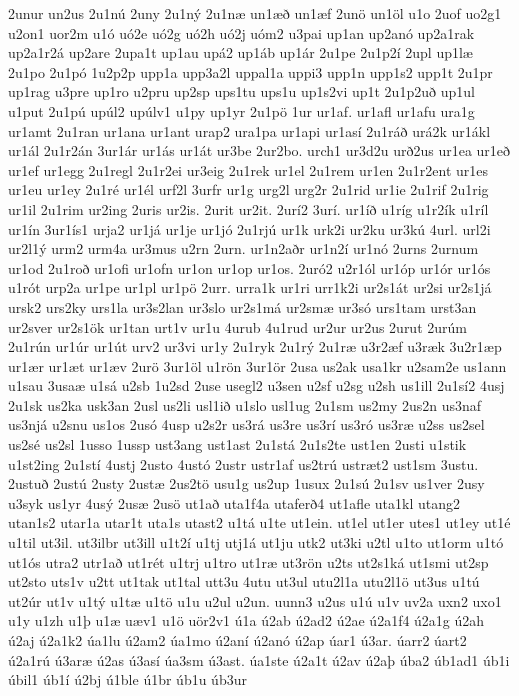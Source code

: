 {2unur
un2us
2u1nú
2uny
2u1ný
2u1næ
un1æð
un1æf
2unö
un1öl
u1o
2uof
uo2g1
u2on1
uor2m
u1ó
uó2e
uó2g
uó2h
uó2j
uóm2
u3pai
up1an
up2anó
up2a1rak
up2a1r2á
up2are
2upa1t
up1au
upá2
up1áb
up1ár
2u1pe
2u1p2í
2upl
up1læ
2u1po
2u1pó
1u2p2p
upp1a
upp3a2l
uppal1a
uppi3
upp1n
upp1s2
upp1t
2u1pr
up1rag
u3pre
up1ro
u2pru
up2sp
ups1tu
ups1u
up1s2vi
up1t
2u1p2uð
up1ul
u1put
2u1pú
upúl2
upúlv1
u1py
up1yr
2u1pö
1ur
ur1af.
ur1afl
ur1afu
ura1g
ur1amt
2u1ran
ur1ana
ur1ant
urap2
ura1pa
ur1api
ur1así
2u1ráð
urá2k
ur1ákl
ur1ál
2u1r2án
3ur1ár
ur1ás
ur1át
ur3be
2ur2bo.
urch1
ur3d2u
urð2us
ur1ea
ur1eð
ur1ef
ur1egg
2u1regl
2u1r2ei
ur3eig
2u1rek
ur1el
2u1rem
ur1en
2u1r2ent
ur1es
ur1eu
ur1ey
2u1ré
ur1él
urf2l
3urfr
ur1g
urg2l
urg2r
2u1rid
ur1ie
2u1rif
2u1rig
ur1il
2u1rim
ur2ing
2uris
ur2is.
2urit
ur2it.
2urí2
3urí.
ur1íð
u1ríg
u1r2ík
u1ríl
ur1ín
3ur1ís1
urja2
ur1já
ur1je
ur1jó
2u1rjú
ur1k
urk2i
ur2ku
ur3kú
4url.
url2i
ur2l1ý
urm2
urm4a
ur3mus
u2rn
2urn.
ur1n2aðr
ur1n2í
ur1nó
2urns
2urnum
ur1od
2u1roð
ur1ofi
ur1ofn
ur1on
ur1op
ur1os.
2uró2
u2r1ól
ur1óp
ur1ór
ur1ós
u1rót
urp2a
ur1pe
ur1pl
ur1pö
2urr.
urra1k
ur1ri
urr1k2i
ur2s1át
ur2si
ur2s1já
ursk2
urs2ky
urs1la
ur3s2lan
ur3slo
ur2s1má
ur2smæ
ur3só
urs1tam
urst3an
ur2sver
ur2s1ök
ur1tan
urt1v
ur1u
4urub
4u1rud
ur2ur
ur2us
2urut
2urúm
2u1rún
ur1úr
ur1út
urv2
ur3vi
ur1y
2u1ryk
2u1rý
2u1ræ
u3r2æf
u3ræk
3u2r1æp
ur1ær
ur1æt
ur1æv
2urö
3ur1öl
u1rön
3ur1ör
2usa
us2ak
usa1kr
u2sam2e
us1ann
u1sau
3usaæ
u1sá
u2sb
1u2sd
2use
usegl2
u3sen
u2sf
u2sg
u2sh
us1ill
2u1sí2
4usj
2u1sk
us2ka
usk3an
2usl
us2li
usl1ið
u1slo
usl1ug
2u1sm
us2my
2us2n
us3naf
us3njá
u2snu
us1os
2usó
4usp
u2s2r
us3rá
us3re
us3rí
us3ró
us3ræ
u2ss
us2sel
us2sé
us2sl
1usso
1ussp
ust3ang
ust1ast
2u1stá
2u1s2te
ust1en
2usti
u1stik
u1st2ing
2u1stí
4ustj
2usto
4ustó
2ustr
ustr1af
us2trú
ustræt2
ust1sm
3ustu.
2ustuð
2ustú
2usty
2ustæ
2us2tö
usu1g
us2up
1usux
2u1sú
2u1sv
us1ver
2usy
u3syk
us1yr
4usý
2usæ
2usö
ut1að
uta1f4a
utaferð4
ut1afle
uta1kl
utang2
utan1s2
utar1a
utar1t
uta1s
utast2
u1tá
u1te
ut1ein.
ut1el
ut1er
utes1
ut1ey
ut1é
u1til
ut3il.
ut3ilbr
ut3ill
u1t2í
u1tj
utj1á
ut1ju
utk2
ut3ki
u2tl
u1to
ut1orm
u1tó
ut1ós
utra2
utr1að
ut1rét
u1trj
u1tro
ut1ræ
ut3rön
u2ts
ut2s1ká
ut1smi
ut2sp
ut2sto
uts1v
u2tt
ut1tak
ut1tal
utt3u
4utu
ut3ul
utu2l1a
utu2l1ö
ut3us
u1tú
ut2úr
ut1v
u1tý
u1tæ
u1tö
u1u
u2ul
u2un.
uunn3
u2us
u1ú
u1v
uv2a
uxn2
uxo1
u1y
u1zh
u1þ
u1æ
uæv1
u1ö
uör2v1
ú1a
ú2ab
ú2ad2
ú2ae
ú2a1f4
ú2a1g
ú2ah
ú2aj
ú2a1k2
úa1lu
ú2am2
úa1mo
ú2aní
ú2anó
ú2ap
úar1
ú3ar.
úarr2
úart2
ú2a1rú
ú3aræ
ú2as
ú3así
úa3sm
ú3ast.
úa1ste
ú2a1t
ú2av
ú2aþ
úba2
úb1ad1
úb1i
úbil1
úb1í
ú2bj
ú1ble
ú1br
úb1u
úb3ur
}
